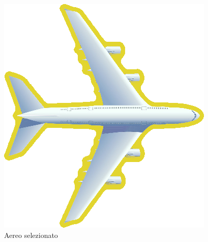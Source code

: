 \documentclass[a4paper,12pt]{report}
\begin{document}
\begin{figure}[H]
    \begin{center}
        \centering
        \includegraphics[scale = 0.3]{img/GuidaUtente/AirplaneSelected.png}
    \end{center}
    \caption{Aereo selezionato}
    \label{img:airplane}
\end{figure}
\end{document}
